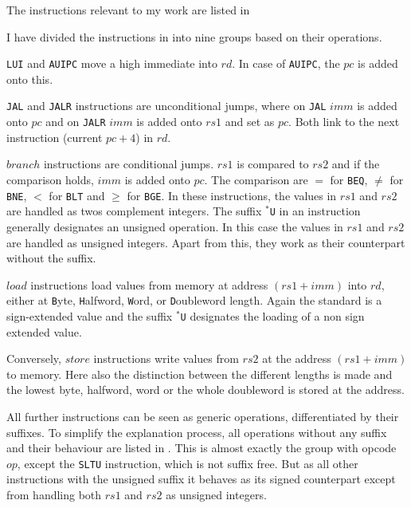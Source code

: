The instructions relevant to my work are listed in


I have divided the instructions in 
into nine groups based on their operations.

\texttt{LUI} and \texttt{AUIPC} move a high immediate into $rd$. In
case of \texttt{AUIPC}, the $pc$ is added onto this.

\texttt{JAL} and \texttt{JALR} instructions are unconditional jumps,
where on \texttt{JAL} $imm$ is added onto $pc$ and on \texttt{JALR}
$imm$ is added onto $rs1$ and set as $pc$. Both link to the next
instruction (current $pc + 4$) in $rd$.

$branch$ instructions are conditional jumps. $rs1$ is compared to
$rs2$ and if the comparison holds, $imm$ is added onto $pc$. The
comparison are $=$ for \texttt{BEQ}, $\neq$ for \texttt{BNE}, $<$ for
\texttt{BLT} and $\ge$ for \texttt{BGE}. In these instructions, the
values in $rs1$ and $rs2$ are handled as twos complement integers.
The suffix \texttt{$^*$U} in an instruction generally designates an
unsigned operation. In this case the values in $rs1$ and $rs2$ are
handled as unsigned integers. Apart from this, they work as their
counterpart without the suffix.

$load$ instructions load values from memory at address $(rs1+imm)$
into $rd$, either at \texttt{B}yte, \texttt{H}alfword, \texttt{W}ord,
or \texttt{D}oubleword length. Again the standard is a sign-extended
value and the suffix \texttt{$^*$U} designates the loading of a non
sign extended value.

Conversely, $store$ instructions write values from $rs2$ at the
address $(rs1+imm)$ to memory. Here also the distinction between the
different lengths is made and the lowest byte, halfword, word or the
whole doubleword is stored at the address.

All further instructions can be seen as generic operations,
differentiated by their suffixes. To simplify the explanation
process, all operations without any suffix and their behaviour are
listed in . This is almost exactly the group
with opcode $op$, except the \texttt{SLTU} instruction, which is not
suffix free. But as all other instructions with the unsigned suffix
it behaves as its signed counterpart except from handling both $rs1$
and $rs2$ as unsigned integers.



